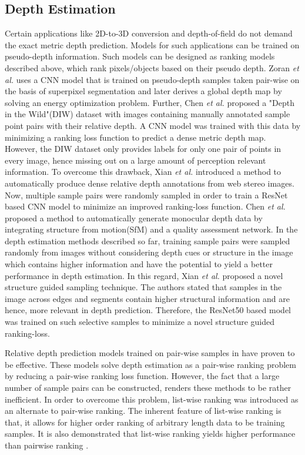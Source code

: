 \subsection*{Depth Estimation}
\label{sec:related:sec3:subsec2:part2}
Certain applications like 2D-to-3D conversion and depth-of-field do not demand the exact metric depth prediction. Models for such applications can be trained on pseudo-depth information. Such models can be designed as ranking models described above, which rank pixels/objects based on their pseudo depth.  Zoran \textit{et al.}\cite{zoran2015learning} uses a CNN model that is trained on pseudo-depth samples taken pair-wise on the basis of superpixel segmentation and later derives a global depth map by solving an energy optimization problem. Further, Chen \textit{et al.}\cite{chen2016single} proposed a "Depth in the Wild"(DIW) dataset with images containing manually annotated sample point pairs with their relative depth. A CNN model was trained with this data by minimizing a ranking loss function to predict a dense metric depth map. However, the DIW dataset only provides labels for only one pair of points in every image, hence missing out on a large amount of perception relevant information. 
To overcome this drawback, Xian \textit{et al.}\cite{xian2018monocular} introduced a method to automatically produce dense relative depth annotations from web stereo images. Now, multiple sample pairs were randomly sampled in order to train a ResNet based CNN model to minimize an improved ranking-loss function. Chen\textit{ et al.}\cite{chen2019learning} proposed a method to automatically generate monocular depth data by integrating structure from motion(SfM) and a quality assessment network.  
In the depth estimation methods described so far, training sample pairs were sampled randomly from images without considering depth cues or structure in the image which contains higher information and have the potential to yield a better performance in depth estimation. In this regard, Xian \textit{et al.}\cite{xian2020structure} proposed a novel structure guided sampling technique. The authors stated that samples in the image across edges and segments contain higher structural information and are hence, more relevant in depth prediction. Therefore, the ResNet50 based model was trained on such selective samples to minimize a novel structure guided ranking-loss\cite{xian2020structure}. 

Relative depth prediction models trained on pair-wise samples in \cite{zoran2015learning,chen2016single,xian2018monocular,xian2020structure} have proven to be effective. These models solve depth estimation as a pair-wise ranking problem by reducing a pair-wise ranking loss function. However, the fact that a large number of sample pairs can be constructed, renders these methods to be rather inefficient. 
In order to overcome this problem, list-wise ranking \cite{xia2008listwise} was introduced as an alternate to pair-wise ranking. The inherent feature of list-wise ranking is that, it allows for higher order ranking of arbitrary length data to be training samples. It is also demonstrated that list-wise ranking yields higher performance than pairwise ranking \cite{xia2008listwise}.

